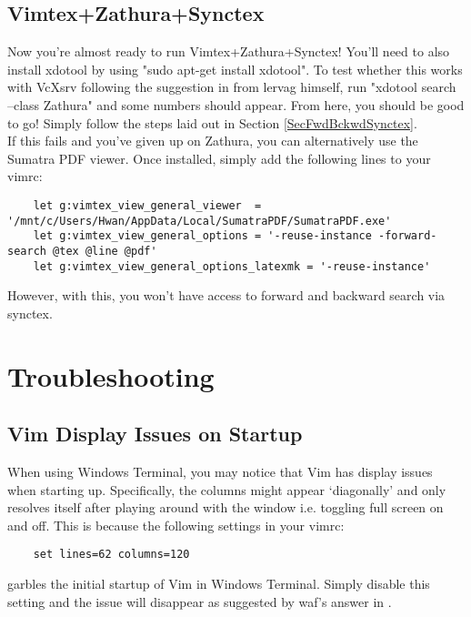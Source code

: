 \subsection{Vimtex+Zathura+Synctex}
Now you're almost ready to run Vimtex+Zathura+Synctex! You'll need to also
install xdotool by using "sudo apt-get install xdotool". To test whether this
works with VcXsrv following the suggestion in \cite{paulrougieux2020vimtex} from
lervag himself, run "xdotool search --class Zathura" and some numbers should
appear. From here, you should be good to go! Simply follow the steps laid out in
Section \ref{SecFwdBckwdSynctex}.\\

If this fails and you've given up on Zathura, you can alternatively use the
Sumatra PDF viewer. Once installed, simply add the following lines to your
vimrc:
\begin{lstlisting}
    let g:vimtex_view_general_viewer  = '/mnt/c/Users/Hwan/AppData/Local/SumatraPDF/SumatraPDF.exe'
    let g:vimtex_view_general_options = '-reuse-instance -forward-search @tex @line @pdf'
    let g:vimtex_view_general_options_latexmk = '-reuse-instance'
\end{lstlisting}
However, with this, you won't have access to forward and backward search via
synctex.

\section{Troubleshooting}

\subsection{Vim Display Issues on Startup}
When using Windows Terminal, you may notice that Vim has display issues when
starting up. Specifically, the columns might appear `diagonally' and only
resolves itself after playing around with the window i.e. toggling full screen
on and off. This is because the following settings in your vimrc:
\begin{lstlisting}
    set lines=62 columns=120
\end{lstlisting}
garbles the initial startup of Vim in Windows Terminal. Simply disable this
setting and the issue will disappear as suggested by waf's answer in
\cite{tompounceonGit2020vim}.

